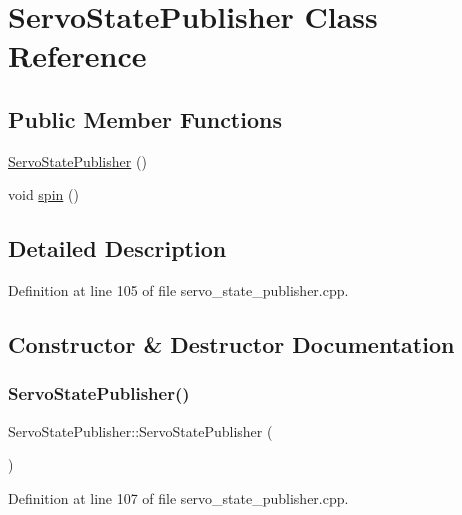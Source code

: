 \hypertarget{classServoStatePublisher}{}\section{Servo\+State\+Publisher Class Reference}
\label{classServoStatePublisher}
\subsection*{Public Member Functions}
\begin{DoxyCompactItemize}
\item 
\mbox{\hyperlink{classServoStatePublisher_a82b539fa71ae62fe2061aa201e4e3e77}{Servo\+State\+Publisher}} ()
\item 
void \mbox{\hyperlink{classServoStatePublisher_a6ef5f5e674a47879a36c6286e601fb9d}{spin}} ()
\end{DoxyCompactItemize}


\subsection{Detailed Description}


Definition at line 105 of file servo\+\_\+state\+\_\+publisher.\+cpp.



\subsection{Constructor \& Destructor Documentation}
\mbox{\label{classServoStatePublisher_a82b539fa71ae62fe2061aa201e4e3e77}} 
\subsubsection{\texorpdfstring{ServoStatePublisher()}{ServoStatePublisher()}}
{\footnotesize\ttfamily Servo\+State\+Publisher\+::\+Servo\+State\+Publisher (\begin{DoxyParamCaption}{ }\end{DoxyParamCaption})\hspace{0.3cm}{\ttfamily [inline]}}



Definition at line 107 of file servo\+\_\+state\+\_\+publisher.\+cpp.



